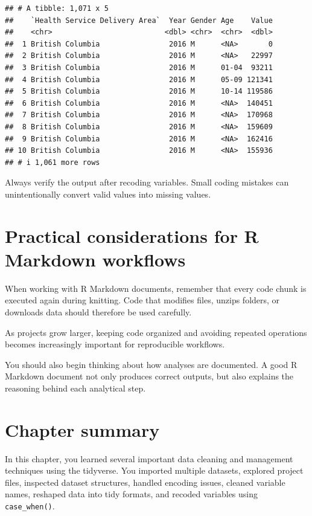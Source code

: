 \documentclass[
  11pt,
  oneside]{book}
\begin{document}
\begin{verbatim}
## # A tibble: 1,071 x 5
##    `Health Service Delivery Area`  Year Gender Age    Value
##    <chr>                          <dbl> <chr>  <chr>  <dbl>
##  1 British Columbia                2016 M      <NA>       0
##  2 British Columbia                2016 M      <NA>   22997
##  3 British Columbia                2016 M      01-04  93211
##  4 British Columbia                2016 M      05-09 121341
##  5 British Columbia                2016 M      10-14 119586
##  6 British Columbia                2016 M      <NA>  140451
##  7 British Columbia                2016 M      <NA>  170968
##  8 British Columbia                2016 M      <NA>  159609
##  9 British Columbia                2016 M      <NA>  162416
## 10 British Columbia                2016 M      <NA>  155936
## # i 1,061 more rows
\end{verbatim}

Always verify the output after recoding variables. Small coding mistakes can unintentionally convert valid values into missing values.

\section{Practical considerations for R Markdown workflows}\label{practical-considerations-for-r-markdown-workflows}

When working with R Markdown documents, remember that every code chunk is executed again during knitting. Code that modifies files, unzips folders, or downloads data should therefore be used carefully.

As projects grow larger, keeping code organized and avoiding repeated operations becomes increasingly important for reproducible workflows.

You should also begin thinking about how analyses are documented. A good R Markdown document not only produces correct outputs, but also explains the reasoning behind each analytical step.

\section{Chapter summary}\label{chapter-summary-3}

In this chapter, you learned several important data cleaning and management techniques using the tidyverse. You imported multiple datasets, explored project files, inspected dataset structures, handled encoding issues, cleaned variable names, reshaped data into tidy formats, and recoded variables using \texttt{case\_when()}.
\end{document}

